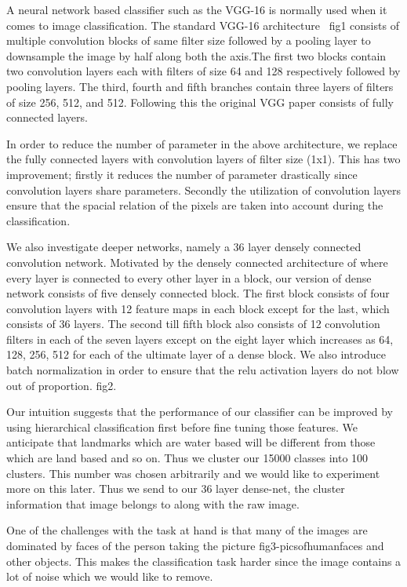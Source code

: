 \documentclass{article}
\begin{document}
A neural network based classifier such as the VGG-16 is normally used when it comes to image classification. The standard VGG-16 architecture {~\figurename{fig1}} consists of 
multiple convolution blocks of same filter size followed by a pooling layer to downsample the image by half along both the axis.The first two blocks contain two convolution layers each with filters of size 64 and 128 respectively followed by pooling layers. The third, fourth and fifth branches contain three layers of filters of size 256, 512, and 512. Following this the original VGG paper consists of fully connected layers. 

In order to reduce the number of parameter in the above architecture, we replace the fully connected layers with convolution layers of filter size (1x1). This has two improvement; firstly it reduces the number of parameter drastically since convolution layers share parameters. Secondly the utilization of convolution layers ensure that the spacial relation of the pixels are taken into account during the classification.

We also investigate deeper networks, namely a 36 layer densely connected convolution network. Motivated by the densely connected architecture of {\cite{huang_densely}} where every layer is connected to every other layer in a block, our version of dense network consists of five densely connected block. The first block consists of four convolution layers with 12 feature maps in each block except for the last, which consists of 36 layers. The second till fifth block also consists of 12 convolution filters in each of the seven layers except on the eight layer which increases as 64, 128, 256, 512 for each of the ultimate layer of a dense block. We also introduce batch normalization {\cite{batch_norm}} in order to ensure that the relu activation layers do not blow out of proportion. {\figurename{fig2}}.

Our intuition suggests that the performance of our classifier can be improved by using hierarchical classification first before fine tuning those features. We anticipate that landmarks which are water based will be different from those which are land based and so on. Thus we cluster our 15000 classes into 100 clusters. This number was chosen arbitrarily and we would like to experiment more on this later. Thus we send to our 36 layer dense-net, the cluster information that image belongs to along with the raw image.

One of the challenges with the task at hand is that many of the images are dominated by faces of the person taking the picture {\figurename{fig3-picsofhumanfaces}} and other objects. This makes the classification task harder since the image contains a lot of noise which we would like to remove. 
\end{document}
